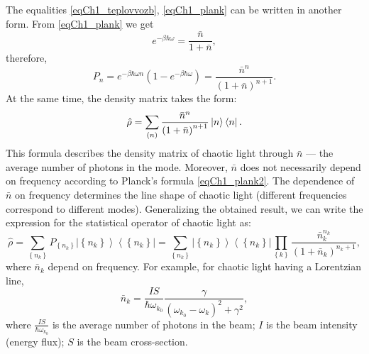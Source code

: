 The equalities \eqref{eqCh1_teplovvozb}, \eqref{eqCh1_plank} can be written in
another form. From \eqref{eqCh1_plank} we get 
\[
e^{-\beta \hbar \omega} = \frac{\bar{n}}{1 + \bar{n}},
\]
therefore, 
\begin{equation}
P_n = e^{-\beta \hbar \omega n} \left(1  -  e^{-\beta \hbar
  \omega}\right) = \frac{\bar{n}^n}{\left(1 + \bar{n}\right)^{n+1}}.
\label{eqCh1_plank2}
\end{equation}
At the same time, the density matrix 
takes the form:
\[
\hat{\rho} = \sum_{(n)}\frac{\bar{n}^n}{\left(1 + \bar{n}\right)^{n+1}}\ket{n}\bra{n}.
\]
This formula describes the density matrix of chaotic light through
$\bar{n}$ — the average number of photons in the mode. Moreover,
$\bar{n}$ does not necessarily depend on frequency according to Planck's formula \eqref{eqCh1_plank2}. The dependence of $\bar{n}$ on frequency
determines the line shape of chaotic light (different frequencies
correspond to different modes). Generalizing the obtained result, we can
write the expression for the statistical operator of chaotic light as:  
\begin{equation}
\hat{\rho} = \sum_{\left\{n_k\right\}} P_{\left\{n_k\right\}} \left|\left\{n_k\right\}\right>\left<\left\{n_k\right\}\right| = 
\sum_{\left\{n_k\right\}} 
 \left|\left\{n_k\right\}\right>\left<\left\{n_k\right\}\right|
\prod_{\left\{k\right\}} 
\frac{\bar{n}_k^{n_k}}{\left(1 + \bar{n}_k\right)^{n_k+1}},
\label{eqCh1_102}
\end{equation}
where $\bar{n}_k$ depend on frequency. For example, for chaotic light
having a Lorentzian line, 
\[
\bar{n}_k = \frac{I S}{\hbar \omega_{k_0}}
\frac{\gamma}{\left(\omega_{k_0} - \omega_{k}\right)^2 + \gamma^2},
\]
where $\frac{I S}{\hbar \omega_{k_0}}$ is the average number of photons in
the beam;  $I$ is the beam intensity (energy flux);  $S$ is the beam cross-section.  
